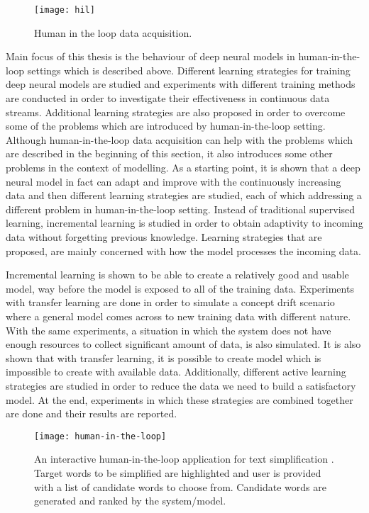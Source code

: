 \begin{figure}[h]
\texttt{[image: hil]}
\centering
\caption{Human in the loop data acquisition.}
\end{figure}

Main focus of this thesis is the behaviour of deep neural models in human-in-the-loop settings which is described above. Different learning strategies for training deep neural models are studied and experiments with different training methods are conducted in order to investigate their effectiveness in continuous data streams. Additional learning strategies are also proposed in order to overcome some of the problems which are introduced by human-in-the-loop setting. Although human-in-the-loop data acquisition can help with the problems which are described in the beginning of this section, it also introduces some other problems in the context of modelling. As a starting point, it is shown that a deep neural model in fact can adapt and improve with the continuously increasing data and then different learning strategies are studied, each of which addressing a different problem in human-in-the-loop setting. Instead of traditional supervised learning, incremental learning is studied in order to obtain adaptivity to incoming data without forgetting previous knowledge. Learning strategies that are proposed, are mainly concerned with how the model processes the incoming data. 

Incremental learning is shown to be able to create a relatively good and usable model, way before the model is exposed to all of the training data. Experiments with transfer learning are done in order to simulate a concept drift scenario where a general model comes across to new training data with different nature. With the same experiments, a situation in which the system does not have enough resources to collect significant amount of data, is also simulated. It is also shown that with transfer learning, it is possible to create model which is impossible to create with available data. Additionally, different active learning strategies are studied in order to reduce the data we need to build a satisfactory model.  At the end, experiments in which these strategies are combined together are done and their results are reported.

\begin{figure}[h]
\texttt{[image: human-in-the-loop]}
\centering
\caption{An interactive human-in-the-loop application for text simplification \cite{par4sim}. Target words to be simplified are highlighted and user is provided with a list of candidate words to choose from. Candidate words are generated and ranked by the system/model.}
\end{figure}


